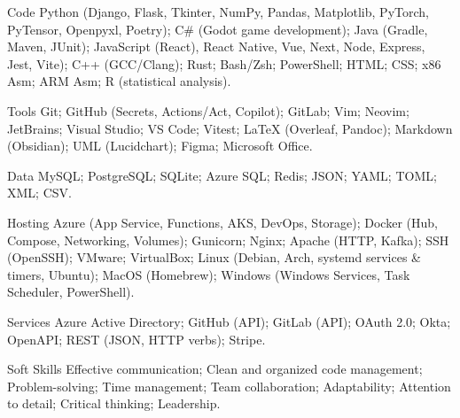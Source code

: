 \documentclass[11pt, a4paper]{awesome-cv}
\begin{document}
  \begin{cvskills}

    \cvskill
      {Code}
      {Python (Django, Flask, Tkinter, NumPy, Pandas, Matplotlib, PyTorch, PyTensor, Openpyxl, Poetry); C\# (Godot game development); Java (Gradle, Maven, JUnit); JavaScript (React), React Native, Vue, Next, Node, Express, Jest, Vite);  C++ (GCC/Clang); Rust; Bash/Zsh; PowerShell; HTML; CSS; x86 Asm; ARM Asm; R (statistical analysis).}

    \cvskill
      {Tools}
      {Git; GitHub (Secrets, Actions/Act, Copilot); GitLab; Vim; Neovim; JetBrains; Visual Studio; VS Code; Vitest; LaTeX (Overleaf, Pandoc); Markdown (Obsidian); UML (Lucidchart); Figma; Microsoft Office.}

    \cvskill
      {Data}
      {MySQL; PostgreSQL; SQLite; Azure SQL; Redis; JSON; YAML; TOML; XML; CSV.}

    \cvskill
      {Hosting}
      {Azure (App Service, Functions, AKS, DevOps, Storage); Docker (Hub, Compose, Networking, Volumes); Gunicorn; Nginx; Apache (HTTP, Kafka); SSH (OpenSSH); VMware; VirtualBox; Linux (Debian, Arch, systemd services \& timers, Ubuntu); MacOS (Homebrew); Windows (Windows Services, Task Scheduler, PowerShell).}

    \cvskill
      {Services}
      {Azure Active Directory; GitHub (API); GitLab (API); OAuth 2.0; Okta; OpenAPI; REST (JSON, HTTP verbs); Stripe.}
    
    \cvskill
      {Soft Skills}
      {Effective communication; Clean and organized code management; Problem-solving; Time management; Team collaboration; Adaptability; Attention to detail; Critical thinking; Leadership.}

  \end{cvskills}

\end{document}
